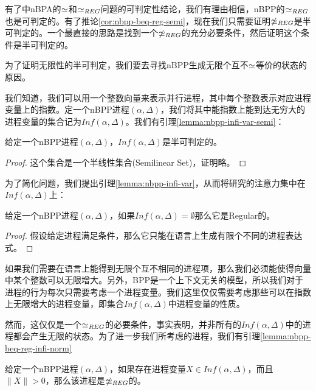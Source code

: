 有了\cite{Fu2013}中nBPA的$\simeq$和$\simeq_{REG}$问题的可判定性结论，我们有理由相信，nBPP的$\simeq_{REG}$也是可判定的。有了推论\ref{cor:nbpp-beq-reg-semi}，现在我们只需要证明$\not\simeq_{REG}$是半可判定的。一个最直接的思路是找到一个$\not\simeq_{REG}$的充分必要条件，然后证明这个条件是半可判定的。

为了证明无限性的半可判定，我们要去寻找nBPP生成无限个互不$\simeq$等价的状态的原因。


我们知道，我们可以用一个整数向量来表示并行进程，其中每个整数表示对应进程变量上的指数。定一个nBPP进程$(\alpha,\Delta)$，我们将其中能指数上能到达无穷大的进程变量的集合记为$Inf(\alpha,\Delta)$。我们有引理\ref{lemma:nbpp-infi-var-semi}：

\begin{lem}\label{lemma:nbpp-infi-var-semi}
给定一个nBPP进程$(\alpha,\Delta)$，$Inf(\alpha,\Delta)$是半可判定的。
\end{lem}

\begin{proof}
这个集合是一个半线性集合(Semilinear Set)，证明略。
\end{proof}

为了简化问题，我们提出引理\ref{lemma:nbpp-infi-var}，从而将研究的注意力集中在$Inf(\alpha,\Delta)$上：

\begin{lem}\label{lemma:nbpp-infi-var}
给定一个nBPP进程$(\alpha,\Delta)$，如果$Inf(\alpha,\Delta)=\emptyset$那么它是Regular的。
\end{lem}

\begin{proof}
假设给定进程满足条件，那么它只能在语言上生成有限个不同的进程表达式。
\end{proof}

如果我们需要在语言上能得到无限个互不相同的进程项，那么我们必须能使得向量中某个整数可以无限增大。另外，BPP是一个上下文无关的模型，所以我们对于进程的行为每次只需要考虑一个进程变量。我们这里仅仅需要考虑那些可以在指数上无限增大的进程变量，即集合$Inf(\alpha,\Delta)$中进程变量的性质。

然而，这仅仅是一个$\simeq_{REG}$的必要条件，事实表明，并非所有的$Inf(\alpha,\Delta)$中的进程都会产生无限的状态。为了进一步我们所考虑的进程，我们有引理\ref{lemma:nbpp-beq-reg-infi-norm}

\begin{lem}\label{lemma:nbpp-beq-reg-infi-norm}
给定一个nBPP进程$(\alpha,\Delta)$，如果存在进程变量$X\in Inf(\alpha,\Delta)$，而且$\|X\|>0$，那么该进程是$\not\simeq_{REG}$的。
\end{lem}


